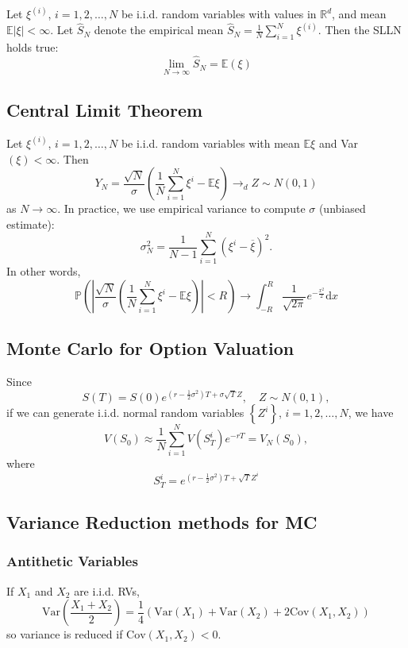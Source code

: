 \documentclass[twocolumn,landscape,10pt]{article}
\theoremstyle{definition}
\begin{document}
Let $\xi^{(i)}$, $i=1,2,\ldots,N$ be i.i.d. random variables with values in
$\mathbb{R}^{d}$, and mean $\mathbb{E}|\xi|<\infty$.
Let $\hat{S}_N$ denote the empirical mean
$\hat{S}_N=\frac{1}{N}\sum_{i=1}^{N}\xi^{(i)}$. Then the SLLN holds true:
\[
    \underset{N\rightarrow\infty}{\lim}\hat{S}_N=\mathbb{E}(\xi)
\]

\subsection{Central Limit Theorem}
Let $\xi^{(i)}$, $i=1,2,\ldots,N$ be i.i.d. random variables with
mean $\mathbb{E}\xi$ and Var$(\xi)<\infty$. Then
\[
    Y_N=\frac{\sqrt{N}}{\sigma}\left(\frac{1}{N}\sum_{i=1}^{N}\xi^i-\mathbb{E}\xi\right)
    \longrightarrow_d
    Z\sim N(0,1)
\]
as $N\rightarrow\infty$. 
In practice, we use empirical variance to compute $\sigma$ (unbiased estimate):
\[
    \sigma^2_N=\frac{1}{N-1}\sum_{i=1}^{N}{\left(\xi^i-\overline{\xi}\right)}^{2}.
\]
In other words,
\[
    \mathbb{P}\left(\left|\frac{\sqrt{N}}{\sigma}\left(\frac{1}{N}\sum_{i=1}^{N}\xi^i-\mathbb{E}\xi\right)\right|<R\right)
    \longrightarrow
    \int_{-R}^{R}\frac{1}{\sqrt{2\pi}}e^{-\frac{x^2}{2}}\mathrm{d}x
\]

\subsection{Monte Carlo for Option Valuation}

Since
\[
    S(T)=S(0)e^{\left(r-\frac{1}{2}\sigma^2\right)T+\sigma\sqrt{T}Z},\quad
    Z\sim N(0,1),
\]
if we can generate i.i.d. normal random variables $\left\{Z^i\right\}$,
$i=1,2,\ldots,N$, we have
\[
    V(S_0)\approx \frac{1}{N}\sum_{i=1}^{N}V(S_T^i)e^{-rT}=V_N(S_0),
\]
where
\[
    S_T^i=e^{\left(r-\frac{1}{2}\sigma^2\right)T+\sqrt{T}Z^i}
\]

\subsection{Variance Reduction methods for MC}

\subsubsection{Antithetic Variables}

If $X_1$ and $X_2$ are i.i.d. RVs,
\[
    \text{Var}\left(\frac{X_1+X_2}{2}\right)
    =\frac{1}{4}\left(\text{Var}(X_1)
    +\text{Var}(X_2)+2\text{Cov}(X_1,X_2)\right)
\]
so variance is reduced if $\text{Cov}(X_1,X_2)<0$.
\end{document}
